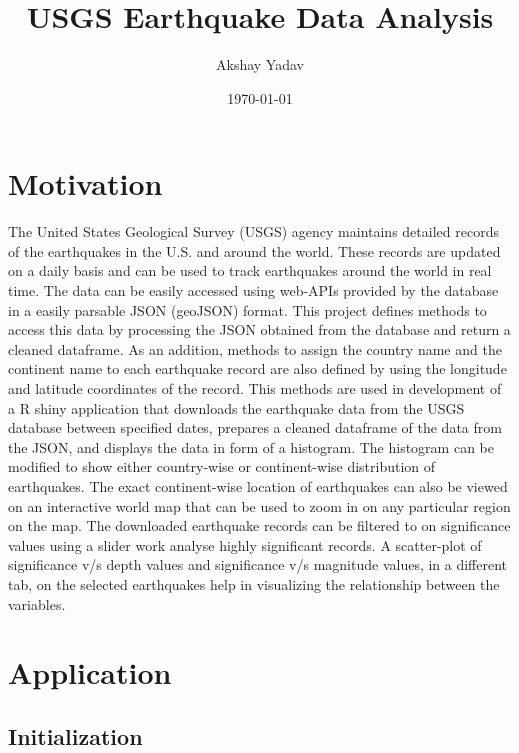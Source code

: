 \documentclass{article}
\title{USGS Earthquake Data Analysis}
\date{\today}
\author{Akshay Yadav}
\begin{document}
	\maketitle
	\section{Motivation}
		The United States Geological Survey (USGS) agency maintains detailed records of the earthquakes in the U.S. and around the world. These records are updated on a daily basis and can be used to track earthquakes around the world in real time. The data can be easily accessed using web-APIs provided by the database in a easily parsable JSON (geoJSON) format. This project defines methods to access this data by processing the JSON obtained from the database and return a cleaned dataframe. As an addition, methods to assign the country name and the continent name to each earthquake record are also defined by using the longitude and latitude coordinates of the record. This methods are used in development of a R shiny application that downloads the earthquake data from the USGS database between specified dates, prepares a cleaned dataframe of the data from the JSON, and displays the data in form of a histogram. The histogram can be modified to show either country-wise or continent-wise distribution of earthquakes. The exact continent-wise location of earthquakes can also be viewed on an interactive world map that can be used to zoom in on any particular region on the map. The downloaded earthquake records can be filtered to on significance values using a slider work analyse highly significant records. A scatter-plot of significance v/s depth values and significance v/s magnitude values, in a different tab, on the selected earthquakes help in visualizing the relationship between the variables.
		
	\section{Application}
		\subsection{Initialization}
	
\end{document}
